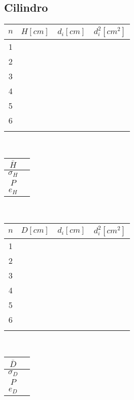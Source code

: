 \documentclass[letter,11pt]{article}
\begin{document}
\subsection{Cilindro}
\begin{tabular}{|c|>{\centering}m{2.0cm}<{\centering}
                  |>{\centering}m{2.0cm}<{\centering}
                  |>{\centering}m{2.0cm}<{\centering}|}
\hline
\textbf{$n$} & \textbf{$H[cm]$}
             & \textbf{$d_i[cm]$}
             & \textbf{$d_i^2[cm^2]$} \tabularnewline \hline
1 & & & \\ \hline
2 & & & \\ \hline
3 & & & \\ \hline
4 & & & \\ \hline
5 & & & \\ \hline
6 & & & \\ \hline
 & & & \\ \hline
\end{tabular}\\

\vspace{0.5cm}
\begin{tabular}{|c|p{2.0cm}|}
\hline
$\bar{H}$ & \\ \hline
$\sigma_H$ & \\ \hline
$P$ & \\ \hline
$e_H$ & \\ \hline
\end{tabular}\\

\begin{tabular}{|c|>{\centering}m{2.0cm}<{\centering}
                  |>{\centering}m{2.0cm}<{\centering}
                  |>{\centering}m{2.0cm}<{\centering}|}
\hline
\textbf{$n$} & \textbf{$D[cm]$}
             & \textbf{$d_i[cm]$}
             & \textbf{$d_i^2[cm^2]$} \tabularnewline \hline
1 & & & \\ \hline
2 & & & \\ \hline
3 & & & \\ \hline
4 & & & \\ \hline
5 & & & \\ \hline
6 & & & \\ \hline
 & & & \\ \hline
\end{tabular}\\

\vspace{0.5cm}
\begin{tabular}{|c|p{2.0cm}|}
\hline
$\bar{D}$ & \\ \hline
$\sigma_D$ & \\ \hline
$P$ & \\ \hline
$e_D$ & \\ \hline
\end{tabular}\\
\end{document}
